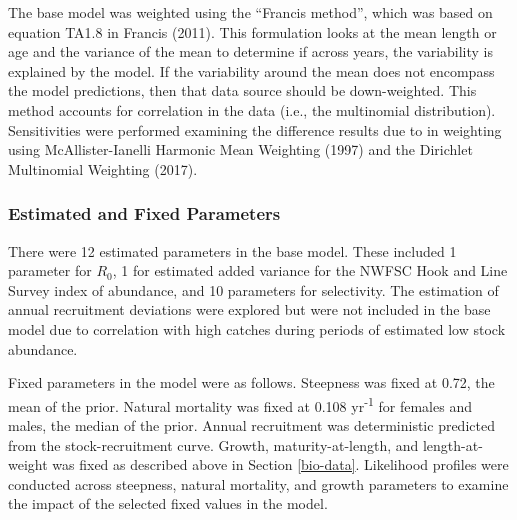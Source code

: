 \documentclass[11pt,
  english,
  a4paper,
]{article}
\begin{document}

The base model was weighted using the ``Francis method'', which was based on equation TA1.8 in Francis {(2011)\leavevmode\tagmcend\tagstructend}. This formulation looks at the mean length or age and the variance of the mean to determine if across years, the variability is explained by the model. If the variability around the mean does not encompass the model predictions, then that data source should be down-weighted. This method accounts for correlation in the data (i.e., the multinomial distribution). Sensitivities were performed examining the difference results due to in weighting using McAllister-Ianelli Harmonic Mean Weighting {(1997)\leavevmode\tagmcend\tagstructend} and the Dirichlet Multinomial Weighting {(2017)\leavevmode\tagmcend\tagstructend}.

\leavevmode\tagmcend\tagstructend\par


\hypertarget{estimated-and-fixed-parameters}{%
\subsubsection{Estimated and Fixed Parameters}\label{estimated-and-fixed-parameters}}

\leavevmode\tagmcend\tagstructend


There were 12 estimated parameters in the base model. These included 1 parameter for {\(R_0\)\leavevmode\tagmcend\tagstructend}, 1 for estimated added variance for the NWFSC Hook and Line Survey index of abundance, and 10 parameters for selectivity. The estimation of annual recruitment deviations were explored but were not included in the base model due to correlation with high catches during periods of estimated low stock abundance.

\leavevmode\tagmcend\tagstructend\par


Fixed parameters in the model were as follows. Steepness was fixed at 0.72, the mean of the prior. Natural mortality was fixed at 0.108 yr\textsuperscript{-1} for females and males, the median of the prior. Annual recruitment was deterministic predicted from the stock-recruitment curve. Growth, maturity-at-length, and length-at-weight was fixed as described above in Section \ref{bio-data}. Likelihood profiles were conducted across steepness, natural mortality, and growth parameters to examine the impact of the selected fixed values in the model.
\end{document}
